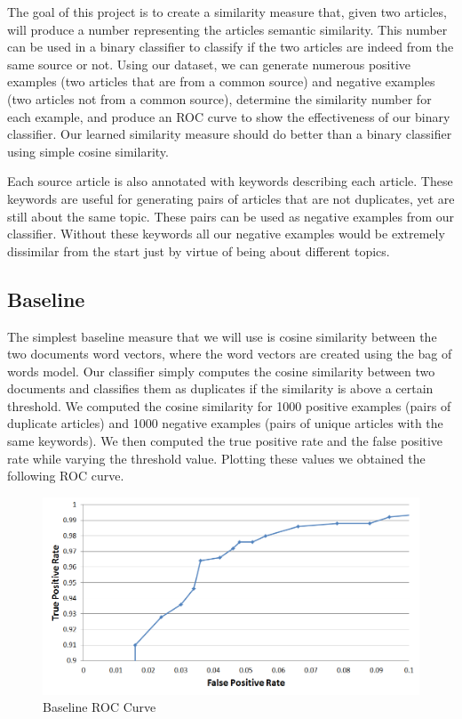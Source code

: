 \documentclass[11pt,letterpaper,oneside, titlepage]{scrartcl}
\begin{document}
The goal of this project is to create a similarity measure that, given two articles, will produce a number representing the articles semantic similarity. This number can be used in a binary classifier to classify if the two articles are indeed from the same source or not. Using our dataset, we can generate numerous positive examples (two articles that are from a common source) and negative examples (two articles not from a common source), determine the similarity number for each example, and produce an ROC curve to show the effectiveness of our binary classifier. Our learned similarity measure should do better than a binary classifier using simple cosine similarity.

Each source article is also annotated with keywords describing each article. These keywords are useful for generating pairs of articles that are not duplicates, yet are still about the same topic. These pairs can be used as negative examples from our classifier. Without these keywords all our negative examples would be extremely dissimilar from the start just by virtue of being about different topics.

\subsection{Baseline}

The simplest baseline measure that we will use is cosine similarity between the two documents word vectors, where the word vectors are created using the bag of words model. Our classifier simply computes the cosine similarity between two documents and classifies them as duplicates if the similarity is above a certain threshold. We computed the cosine similarity for 1000 positive examples (pairs of duplicate articles) and 1000 negative examples (pairs of unique articles with the same keywords). We then computed the true positive rate and the false positive rate while varying the threshold value. Plotting these values we obtained the following ROC curve.

\begin{figure}[h!]
  \centering
  \includegraphics[width=1\textwidth]{baseline_ROC}
  \caption{Baseline ROC Curve}
  \label{fig:baseline_ROC}
\end{figure}
\end{document}
